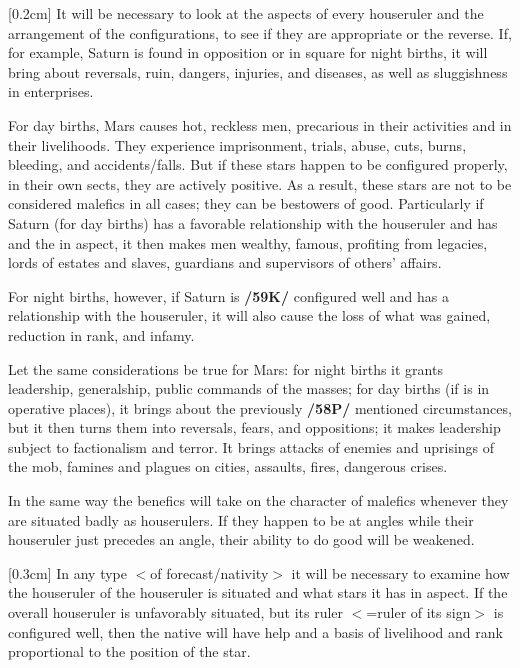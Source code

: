 [0.2cm]
It will be necessary to look at the aspects of every houseruler and the arrangement of the configurations,
to see if they are appropriate or the reverse. If, for example, Saturn is found in opposition or in square for night births, it will bring about reversals, ruin, dangers, injuries, and diseases, as well as sluggishness in
enterprises. 

For day births, Mars causes hot, reckless men, precarious in their activities and in their livelihoods. They experience imprisonment, trials, abuse, cuts, burns, bleeding, and accidents/falls. But \mnmb if these stars happen to be configured properly, in their own sects, they are actively positive. As a result, these stars are not to be considered malefics in all cases; they can be bestowers of good. Particularly if Saturn (for day births) has a favorable relationship with the houseruler and has \Jupiter\xspace and the \Sun\xspace in aspect, it then makes men wealthy, famous, profiting from legacies, lords of estates and slaves, guardians and supervisors of others' affairs. 

For night births, however, if Saturn is \textbf{/59K/} configured well and has a relationship with the houseruler, it will also cause the loss of what was gained, reduction in rank, and infamy. 

Let the same considerations be true for Mars: for night births it grants leadership, generalship, public commands of the masses; for day births (if \Mars\xspace is in operative places), it brings about the previously \textbf{/58P/} mentioned circumstances, but it then turns them into reversals, fears, and oppositions; it makes leadership subject to factionalism and terror. It brings attacks of enemies and uprisings of the mob, famines and plagues on cities, assaults, fires, dangerous crises.

\mnbm[0.2cm]
In the same way the benefics will take on the character of malefics whenever they are situated badly as houserulers. If they happen to be at angles while their houseruler just precedes an angle, their ability to do good will be weakened. 

[0.3cm]
In any type $<$of forecast/nativity$>$ it will be necessary to examine how the houseruler of the houseruler is situated and what stars it has in aspect. If the overall houseruler is
unfavorably situated, but its ruler $<$=ruler of its sign$>$ is configured well, then the native will have help and
a basis of livelihood and rank proportional to the position of the star.

\newpage
